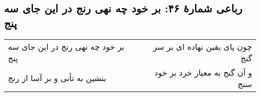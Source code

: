 \begin{center}
\section*{رباعی شمارهٔ ۴۶: بر خود چه نهی رنج در این جای سه پنج}
\label{sec:046}
\begin{longtable}{l p{0.5cm} r}
بر خود چه نهی رنج در این جای سه پنج
&&
چون پای یقین نهاده ای بر سر گنج
\\
بنشین به تأنی و بر آسا از رنج
&&
و آن گنج به معیار خرد بر خود سنج
\\
\end{longtable}
\end{center}
